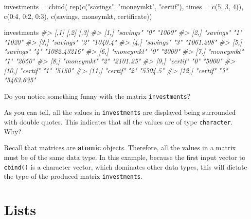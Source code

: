 \documentclass[
]{book}
\newenvironment{Shaded}{\begin{snugshade}}{\end{snugshade}}
\newcommand{\AttributeTok}[1]{\textcolor[rgb]{0.77,0.63,0.00}{#1}}
\newcommand{\CommentTok}[1]{\textcolor[rgb]{0.56,0.35,0.01}{\textit{#1}}}
\newcommand{\DecValTok}[1]{\textcolor[rgb]{0.00,0.00,0.81}{#1}}
\newcommand{\FunctionTok}[1]{\textcolor[rgb]{0.00,0.00,0.00}{#1}}
\newcommand{\NormalTok}[1]{#1}
\newcommand{\OtherTok}[1]{\textcolor[rgb]{0.56,0.35,0.01}{#1}}
\newcommand{\SpecialCharTok}[1]{\textcolor[rgb]{0.00,0.00,0.00}{#1}}
\newcommand{\StringTok}[1]{\textcolor[rgb]{0.31,0.60,0.02}{#1}}
\begin{document}
\begin{Shaded}
\begin{Highlighting}[]
\NormalTok{investments }\OtherTok{=} \FunctionTok{cbind}\NormalTok{(}
  \FunctionTok{rep}\NormalTok{(}\FunctionTok{c}\NormalTok{(}\StringTok{"savings"}\NormalTok{, }\StringTok{"moneymkt"}\NormalTok{, }\StringTok{"certif"}\NormalTok{), }\AttributeTok{times =} \FunctionTok{c}\NormalTok{(}\DecValTok{5}\NormalTok{, }\DecValTok{3}\NormalTok{, }\DecValTok{4}\NormalTok{)),}
  \FunctionTok{c}\NormalTok{(}\DecValTok{0}\SpecialCharTok{:}\DecValTok{4}\NormalTok{, }\DecValTok{0}\SpecialCharTok{:}\DecValTok{2}\NormalTok{, }\DecValTok{0}\SpecialCharTok{:}\DecValTok{3}\NormalTok{), }
  \FunctionTok{c}\NormalTok{(savings, moneymkt, certificate))}

\NormalTok{investments}
\CommentTok{\#\textgreater{}       [,1]       [,2] [,3]        }
\CommentTok{\#\textgreater{}  [1,] "savings"  "0"  "1000"      }
\CommentTok{\#\textgreater{}  [2,] "savings"  "1"  "1020"      }
\CommentTok{\#\textgreater{}  [3,] "savings"  "2"  "1040.4"    }
\CommentTok{\#\textgreater{}  [4,] "savings"  "3"  "1061.208"  }
\CommentTok{\#\textgreater{}  [5,] "savings"  "4"  "1082.43216"}
\CommentTok{\#\textgreater{}  [6,] "moneymkt" "0"  "2000"      }
\CommentTok{\#\textgreater{}  [7,] "moneymkt" "1"  "2050"      }
\CommentTok{\#\textgreater{}  [8,] "moneymkt" "2"  "2101.25"   }
\CommentTok{\#\textgreater{}  [9,] "certif"   "0"  "5000"      }
\CommentTok{\#\textgreater{} [10,] "certif"   "1"  "5150"      }
\CommentTok{\#\textgreater{} [11,] "certif"   "2"  "5304.5"    }
\CommentTok{\#\textgreater{} [12,] "certif"   "3"  "5463.635"}
\end{Highlighting}
\end{Shaded}

Do you notice something funny with the matrix \texttt{investments}?

As you can tell, all the values in \texttt{investments} are displayed being surrounded
with double quotes. This indicates that all the values are of type \texttt{character}.
Why?

Recall that matrices are \textbf{atomic} objects. Therefore, all the values in a
matrix must be of the same data type. In this example, because the first
input vector to \texttt{cbind()} is a character vector, which dominates other data
types, this will dictate the type of the produced matrix \texttt{investments}.

\hypertarget{lists}{%
\chapter{Lists}\label{lists}}
\end{document}

